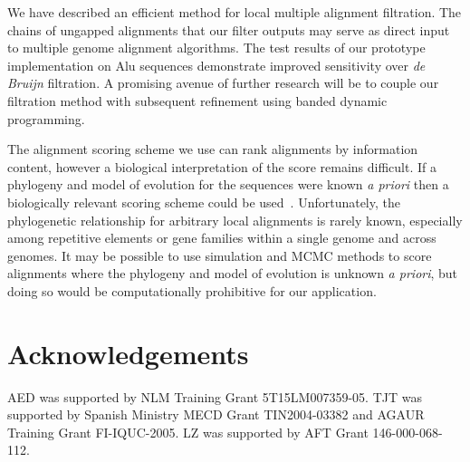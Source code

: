 \documentclass{llncs}
\begin{document}
We have described an efficient method for local multiple alignment
filtration.  The chains of ungapped alignments that our filter
outputs may serve as direct input to multiple genome alignment
algorithms. The test results of our prototype implementation on Alu
sequences demonstrate improved sensitivity over \textit{de Bruijn}
filtration.  A promising avenue of further research will be to
couple our filtration method with subsequent refinement using banded
dynamic programming.

The alignment scoring scheme we use can rank alignments by
information content, however a biological interpretation of the
score remains difficult. If a phylogeny and model of evolution for
the sequences were known \textit{a priori} then a biologically
relevant scoring scheme could be used~\cite{ref-tompa05}.
Unfortunately, the phylogenetic relationship for arbitrary local
alignments is rarely known, especially among repetitive elements or
gene families within a single genome and across genomes. It may be
possible to use simulation and MCMC methods to score alignments
where the phylogeny and model of evolution is unknown \textit{a
priori}, but doing so would be computationally prohibitive for our
application.

\section{ Acknowledgements }
AED was supported by NLM Training Grant 5T15LM007359-05. TJT was
supported by Spanish Ministry MECD Grant TIN2004-03382 and AGAUR
Training Grant FI-IQUC-2005. LZ was supported by AFT Grant
146-000-068-112.



\small

\end{document}
